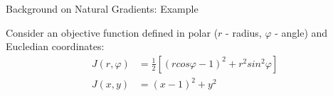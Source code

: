 \documentclass[]{beamer}
\begin{document}
\begin{frame}{Background on Natural Gradients: Example}

    Consider an objective function defined in polar ($r$ - radius, $\varphi$ - angle) and Eucledian coordinates:
    {\small
    \begin{align*}
        J(r, \varphi) &= \frac{1}{2}\left[(r cos\varphi - 1)^2 + r^2 sin^2\varphi \right]\\
        J(x, y) &= (x - 1)^2 + y^2
    \end{align*} }
\begin{figure}
    \vspace{-0.8cm}
    \centering
           \label{fig:field}
            \label{fig:paths}
\end{figure}

{\let\thefootnote\relax{}}

\end{frame}
\end{document}
